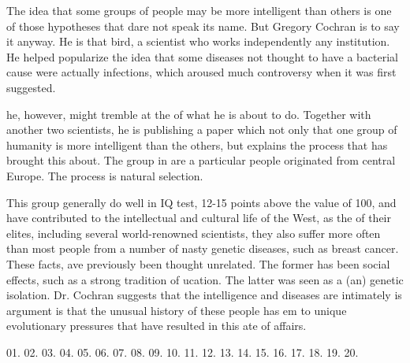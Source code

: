 \qquad The idea that some groups of people may be more intelligent than others is one of those hypotheses that dare not speak its name. But Gregory Cochran is \underline{\quad}  to say it anyway. He is that \underline{\quad}  bird, a scientist who works independently \underline{\quad}  any institution. He helped popularize the idea that some diseases not \underline{\quad}  thought to have a bacterial cause were actually infections, which aroused much controversy when it was first suggested.

\qquad \underline{\quad} he, however, might tremble at the \underline{\quad}  of what he is about to do. Together with another two scientists, he is publishing a paper which not only \underline{\quad}  that one group of humanity is more intelligent than the others, but explains the process that has brought this about. The group in \underline{\quad} are a particular people originated from central Europe. The process is natural selection.

\qquad This group generally do well in IQ test, \underline{\quad} 12-15 points above the \underline{\quad}  value of 100, and have contributed \underline{\quad}  to the intellectual and cultural life of the West, as the \underline{\quad}  of their elites, including several world-renowned scientists, \underline{\quad} they also suffer more often than most people from a number of nasty genetic diseases, such as breast cancer. These facts, \underline{\quad} ave previously been thought unrelated. The former has been \underline{\quad}  social effects, such as a strong tradition of \underline{\quad} ucation. The latter was seen as a (an) \underline{\quad} genetic isolation. Dr. Cochran suggests that the intelligence and diseases are intimately \underline{\quad} is argument is that the unusual history of these people has \underline{\quad} em to unique evolutionary pressures that have resulted in this \underline{\quad} ate of affairs.

01. 
02. 
03. 
04. 
05. 
06. 
07. 
08. 
09. 
10. 
11. 
12. 
13. 
14. 
15. 
16. 
17. 
18. 
19. 
20. 